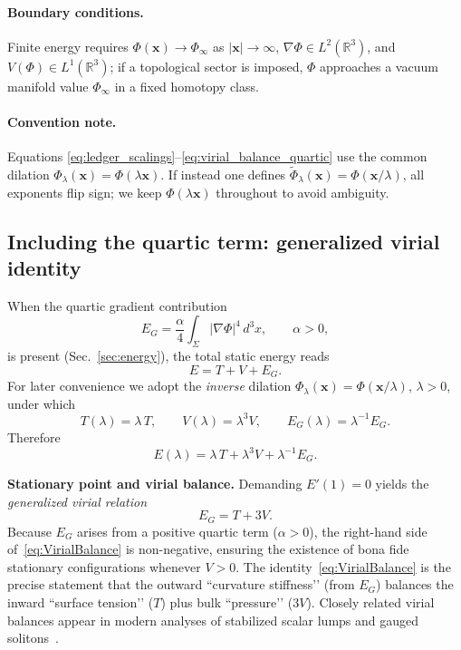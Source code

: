 \documentclass{article}
\begin{document}
\paragraph{Boundary conditions.}
Finite energy requires \(\Phi(\mathbf{x})\to\Phi_\infty\) as \(|\mathbf{x}|\to\infty\), \(\nabla\Phi\in L^2(\mathbb{R}^3)\), and \(V(\Phi)\in L^1(\mathbb{R}^3)\); if a topological sector is imposed, \(\Phi\) approaches a vacuum manifold value \(\Phi_\infty\) in a fixed homotopy class.

\paragraph{Convention note.}
Equations \eqref{eq:ledger_scalings}–\eqref{eq:virial_balance_quartic} use the common dilation \(\Phi_\lambda(\mathbf{x})=\Phi(\lambda\mathbf{x})\).
If instead one defines \(\widetilde{\Phi}_\lambda(\mathbf{x})=\Phi(\mathbf{x}/\lambda)\), all exponents flip sign; we keep \(\Phi(\lambda\mathbf{x})\) throughout to avoid ambiguity.


\subsection{Including the quartic term: generalized virial identity}
\label{subsec:VirialQuartic}

When the quartic gradient contribution
\begin{equation}
E_G=\frac{\alpha}{4}\int_{\Sigma}|\nabla\Phi|^4\,d^3x,
\qquad \alpha>0,
\label{eq:EG_repeat}
\end{equation}
is present (Sec.~\ref{sec:energy}), the total static energy reads
\begin{equation}
E = T+V+E_G.
\label{eq:E_TVEG}
\end{equation}
For later convenience we adopt the \emph{inverse} dilation $\Phi_\lambda(\mathbf{x})=\Phi(\mathbf{x}/\lambda)$, $\lambda>0$, under which
\begin{equation}
T(\lambda)=\lambda\,T,
\qquad
V(\lambda)=\lambda^{3}V,
\qquad
E_G(\lambda)=\lambda^{-1}E_G.
\label{eq:InverseScaling}
\end{equation}
Therefore
\begin{equation}
E(\lambda)=\lambda\,T+\lambda^{3}V+\lambda^{-1}E_G.
\label{eq:E_lambda_inverse}
\end{equation}

\textbf{Stationary point and virial balance.}
Demanding $E'(1)=0$ yields the \emph{generalized virial relation}
\begin{equation}
E_G = T + 3V.
\label{eq:VirialBalance}
\end{equation}
Because $E_G$ arises from a positive quartic term ($\alpha>0$), the right-hand side of~\eqref{eq:VirialBalance} is non-negative, ensuring the existence of bona fide stationary configurations whenever $V>0$. The identity~\eqref{eq:VirialBalance} is the precise statement that the outward “curvature stiffness’’ (from $E_G$) balances the inward “surface tension’’ ($T$) plus bulk “pressure’’ ($3V$). Closely related virial balances appear in modern analyses of stabilized scalar lumps and gauged solitons~\cite{Ferreira2025_GaugedQballs}.
\end{document}
